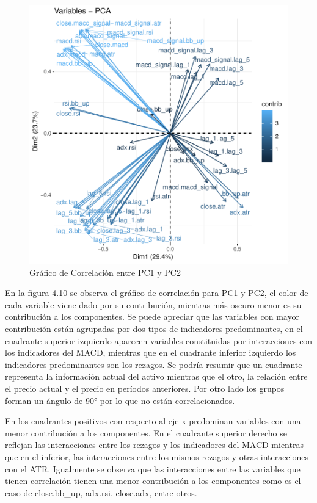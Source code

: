 \documentclass[a4paper,12pt]{Latex/Classes/PhDthesisPSnPDF}
\begin{document}
\begin{figure}[H]
\centering
\includegraphics{main-016}
\caption{Gráfico de Correlación entre PC1 y PC2}
\end{figure}

En la figura 4.10 se observa el gráfico de correlación para PC1 y PC2, el color de cada variable viene dado por su contribución, mientras más oscuro menor es su contribución a los componentes. Se puede apreciar que las variables con mayor contribución están agrupadas por dos tipos de indicadores predominantes, en el cuadrante superior izquierdo aparecen variables constituidas por interacciones con los indicadores del MACD, mientras que en el cuadrante inferior izquierdo los indicadores predominantes son los rezagos. Se podría resumir que un cuadrante representa la información actual del activo mientras que el otro, la relación entre el precio actual y el precio en períodos anteriores. Por otro lado los grupos forman un ángulo de 90° por lo que no están correlacionados.

En los cuadrantes positivos con respecto al eje x predominan variables con una menor contribución a los componentes. En el cuadrante superior derecho se reflejan las interacciones entre los rezagos y los indicadores del MACD mientras que en el inferior, las interacciones entre los mismos rezagos y otras interacciones con el ATR. Igualmente se observa que las interacciones entre las variables que tienen correlación tienen una menor contribución a los componentes como es el caso de close.bb\_up, adx.rsi, close.adx, entre otros.
\end{document}
